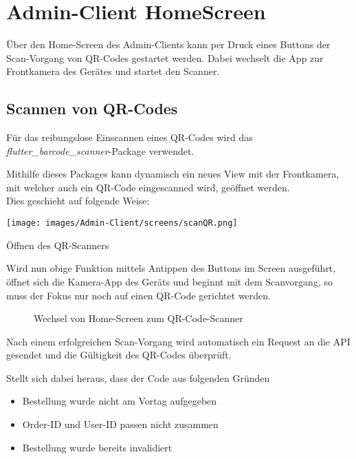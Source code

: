 \section{Admin-Client HomeScreen}

Über den Home-Screen des Admin-Clients kann per Druck eines Buttons der Scan-Vorgang
von QR-Codes gestartet werden. Dabei wechselt die App zur Frontkamera des Gerätes und startet den Scanner.

\subsection{Scannen von QR-Codes}

Für das reibungslose Einscannen eines QR-Codes wird das \textit{flutter\_barcode\_scanner}-Package
verwendet.\cite{flutterBarcodeScanner2021}

Mithilfe dieses Packages kann dynamisch ein neues View mit der Frontkamera, mit welcher auch 
ein QR-Code eingescanned wird, geöffnet werden.\\
Dies geschieht auf folgende Weise:

\begin{code}[H]
    \centering
    \texttt{[image: images/Admin-Client/screens/scanQR.png]}
    \vspace{-25pt}
    \caption{Öffnen des QR-Scanners}
\end{code}

Wird nun obige Funktion mittels Antippen des Buttons im Screen ausgeführt, öffnet sich die 
Kamera-App des Geräts und beginnt mit dem Scanvorgang, so muss der Fokus nur noch auf einen 
QR-Code gerichtet werden.

\begin{figure}[H]
    \centering
    \hfill
    \hfill
    \hfill
    \caption{Wechsel von Home-Screen zum QR-Code-Scanner}
\end{figure}

Nach einem erfolgreichen Scan-Vorgang wird automatisch ein Request an die API gesendet und die
Gültigkeit des QR-Codes überprüft.

Stellt sich dabei heraus, dass der Code aus folgenden Gründen

\begin{itemize}
    \item Bestellung wurde nicht am Vortag aufgegeben
    \item Order-ID und User-ID passen nicht zusammen
    \item Bestellung wurde bereits invalidiert
\end{itemize}

